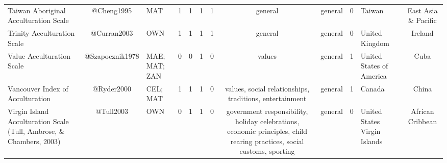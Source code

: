 \begin{longtable}[l]{lclclclclclc}
Taiwan Aboriginal Acculturation Scale & @Cheng1995 & MAT & 1 & 1 & 1 & 1 & general & general & 0 & Taiwan & East Asia \& Pacific\\
Trinity Acculturation Scale & @Curran2003 & OWN & 1 & 1 & 1 & 1 & general & general & 0 & United Kingdom & Ireland\\
Value Acculturation Scale & @Szapocznik1978 & MAE; MAT; ZAN & 0 & 0 & 1 & 0 & values & general & 1 & United States of America & Cuba\\
Vancouver Index of Acculturation & @Ryder2000 & CEL; MAT & 1 & 1 & 1 & 0 & values, social relationships, traditions, entertainment & general & 1 & Canada & China\\
Virgin Island Acculturation Scale (Tull, Ambrose, \& Chambers, 2003) & @Tull2003 & OWN & 0 & 1 & 1 & 0 & government responsibility, holiday celebrations, economic principles, child rearing practices, social customs, sporting & general & 0 & United States Virgin Islands & African Cribbean\\*
\end{longtable}
